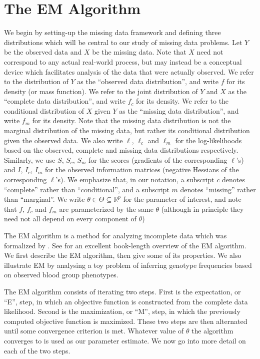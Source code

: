 \documentclass[11pt, oneside]{article}   	%
\newcommand{\bR}{\mathbb{R}}
\begin{document}
\section{The EM Algorithm}
\label{sec:EM}

We begin by setting-up the missing data framework and defining three distributions which will be central to our study of missing data problems. Let $Y$ be the observed data and $X$ be the missing data. Note that $X$ need not correspond to any actual real-world process, but may instead be a conceptual device which facilitates analysis of the data that were actually observed. We refer to the distribution of $Y$ as the ``observed data distribution'', and write $f$ for its density (or mass function). We refer to the joint distribution of $Y$ and $X$ as the ``complete data distribution'', and write $f_c$ for its density. We refer to the conditional distribution of $X$ given $Y$ as the ``missing data distribution'', and write $f_m$ for its density. Note that the missing data distribution is not the marginal distribution of the missing data, but rather its conditional distribution given the observed data. We also write $\ell$, $\ell_c$ and $\ell_m$ for the log-likelihoods based on the observed, complete and missing data distributions respectively. Similarly, we use $S$, $S_c$, $S_m$ for the scores (gradients of the corresponding $\ell$'s) and $I$, $I_c$, $I_m$ for the observed information matrices (negative Hessians of the corresponding $\ell$'s). We emphasize that, in our notation, a subscript $c$ denotes ``complete'' rather than ``conditional'', and a subscript $m$ denotes ``missing'' rather than ``marginal''. We write $\theta \in \Theta \subseteq \bR^p$ for the parameter of interest, and note that $f$, $f_c$ and $f_m$ are parameterized by the same $\theta$ (although in principle they need not all depend on every component of $\theta$)

The EM algorithm is a method for analyzing incomplete data which was formalized by \citet{Dem77}. See \citet{McL08} for an excellent book-length overview of the EM algorithm. We first describe the EM algorithm, then give some of its properties. We also illustrate EM by analysing a toy problem of inferring genotype frequencies based on observed blood group phenotypes.

The EM algorithm consists of iterating two steps. First is the expectation, or ``E'', step, in which an objective function is constructed from the complete data likelihood. Second is the maximization, or ``M'', step, in which the previously computed objective function is maximized. These two steps are then alternated until some convergence criterion is met. Whatever value of $\theta$ the algorithm converges to is used as our parameter estimate. We now go into more detail on each of the two steps.
\end{document}
